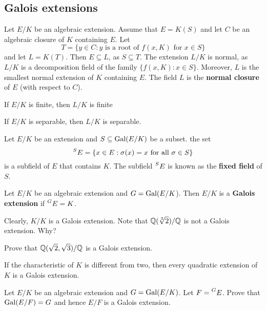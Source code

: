 \subsection{Galois extensions}

Let $E/K$ be an algebraic extension. Assume that $E=K(S)$ and
let $C$ be an algebraic closure of $K$ containing $E$. Let 
\[
T=\{y\in C:y\text{ is a root of $f(x,K)$ for $x\in S$}\}
\]
and let $L=K(T)$. Then $E\subseteq L$, as $S\subseteq T$. The extension
$L/K$ is normal, as $L/K$ is a decomposition field of the family $\{f(x,K):x\in S\}$. 
Moreover, $L$ is the smallest normal extension of $K$ containing $E$. The field
$L$ is the \textbf{normal closure} of $E$ (with respect to $C$). 

\begin{exercise}
If $E/K$ is finite, then $L/K$ is finite
\end{exercise}

\begin{exercise}
If $E/K$ is separable, then $L/K$ is separable.
\end{exercise}

Let $E/K$ be an extension and $S\subseteq\operatorname{Gal}(E/K)$ be a subset. 
the set 
\[
    \prescript{S}{}{E}=\{x\in E:\sigma(x)=x\text{ for all $\sigma\in S$}\}
\]
is a subfield of $E$ that contains $K$. The subfield $\prescript{S}{}{E}$
is known as the \textbf{fixed field} of $S$. 

\begin{definition}
    Let $E/K$ be an algebraic extension and $G=\operatorname{Gal}(E/K$). 
    Then $E/K$ is a \textbf{Galois extension} if $\prescript{G}{}{E}=K$. 
\end{definition}

Clearly, $K/K$ is a Galois extension. 
Note that $\mathbb{Q}(\sqrt[3]{2})/\mathbb{Q}$ is not a Galois extension. Why?

\begin{exercise}
    Prove that $\mathbb{Q}(\sqrt{2},\sqrt{3})/\mathbb{Q}$ is a Galois extension. 
\end{exercise}

\begin{exercise}
If the characteristic of $K$ is different from two, 
then every quadratic extension of $K$ is a Galois extension. 
\end{exercise}

\begin{exercise}
    Let $E/K$ be an algebraic extension and $G=\operatorname{Gal}(E/K)$. Let
    $F=\prescript{G}{}{E}$. Prove that $\operatorname{Gal}(E/F)=G$ and hence $E/F$ is a Galois extension. 
\end{exercise}

